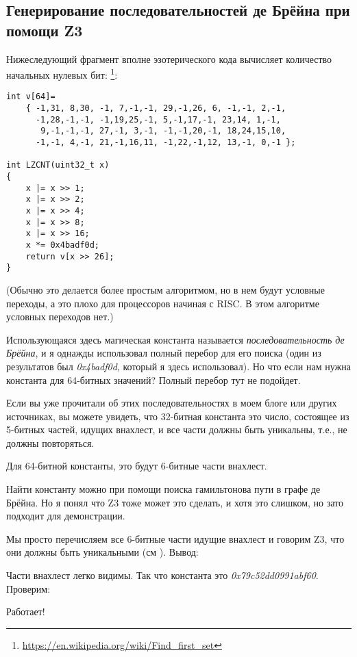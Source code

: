 \subsection{Генерирование последовательностей де Брёйна при помощи Z3}
\label{DeBruijnZ3}

\renewcommand{\CURPATH}{equations/de_bruijn_SMT}

Нижеследующий фрагмент вполне эзотерического кода вычисляет количество начальных нулевых бит:
\footnote{\url{https://en.wikipedia.org/wiki/Find_first_set}}:

\begin{lstlisting}
int v[64]=
	{ -1,31, 8,30, -1, 7,-1,-1, 29,-1,26, 6, -1,-1, 2,-1,
	  -1,28,-1,-1, -1,19,25,-1, 5,-1,17,-1, 23,14, 1,-1,
	   9,-1,-1,-1, 27,-1, 3,-1, -1,-1,20,-1, 18,24,15,10,
	  -1,-1, 4,-1, 21,-1,16,11, -1,22,-1,12, 13,-1, 0,-1 };

int LZCNT(uint32_t x)
{
    x |= x >> 1;
    x |= x >> 2;
    x |= x >> 4;
    x |= x >> 8;
    x |= x >> 16;
    x *= 0x4badf0d;
    return v[x >> 26];
}
\end{lstlisting}

(Обычно это делается более простым алгоритмом, но в нем будут условные переходы,
а это плохо для процессоров начиная с RISC. В этом алгоритме условных переходов нет.)

Использующаяся здесь магическая константа называется \textit{последовательность де Брёйна},
и я однажды использовал полный перебор для его поиска (один из результатов был \textit{0x4badf0d},
который я здесь использовал).
Но что если нам нужна константа для 64-битных значений?
Полный перебор тут не подойдет.

Если вы уже прочитали об этих последовательностях в моем блоге или других источниках,
вы можете увидеть, что 32-битная константа это число, состоящее из 5-битных частей, идущих внахлест,
и все части должны быть уникальны, т.е., не должны повторяться.

Для 64-битной константы, это будут 6-битные части внахлест.

Найти константу можно при помощи поиска гамильтонова пути в графе де Брёйна.
Но я понял что Z3 тоже может это сделать, и хотя это слишком, но зато подходит для демонстрации.



Мы просто перечисляем все 6-битные части идущие внахлест и говорим Z3, что они должны быть уникальными (см ).
Вывод:



Части внахлест легко видимы.
Так что константа это \textit{0x79c52dd0991abf60}.
Проверим:



Работает!

